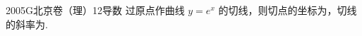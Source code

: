 
\begin{problem}{2005}{G}{北京卷（理）}{12}{导数}
过原点作曲线 $y=e^x$ 的切线，则切点的坐标为\underline{\hspace{4em}}，切线的斜率为\underline{\hspace{4em}}.
\end{problem}

\begin{answer}

\end{answer}

\begin{solutions}

\end{solutions}